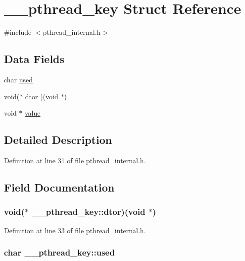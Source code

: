 \hypertarget{struct____pthread__key}{\section{\+\_\+\+\_\+pthread\+\_\+key Struct Reference}
\label{struct____pthread__key}
}


{\ttfamily \#include $<$pthread\+\_\+internal.\+h$>$}

\subsection*{Data Fields}
\begin{DoxyCompactItemize}
\item 
char \hyperlink{struct____pthread__key_a81c10bf0d5d76671f389c4aec1af2e1b}{used}
\item 
void($\ast$ \hyperlink{struct____pthread__key_a8a2c00bb7dbce7d43b3078c6214bc390}{dtor} )(void $\ast$)
\item 
void $\ast$ \hyperlink{struct____pthread__key_a35d38627e4a0de2e247671f0b5b6322a}{value}
\end{DoxyCompactItemize}


\subsection{Detailed Description}


Definition at line 31 of file pthread\+\_\+internal.\+h.



\subsection{Field Documentation}
\hypertarget{struct____pthread__key_a8a2c00bb7dbce7d43b3078c6214bc390}{
\subsubsection[{dtor}]{\setlength{\rightskip}{0pt plus 5cm}void($\ast$ \+\_\+\+\_\+pthread\+\_\+key\+::dtor)(void $\ast$)}}\label{struct____pthread__key_a8a2c00bb7dbce7d43b3078c6214bc390}


Definition at line 33 of file pthread\+\_\+internal.\+h.

\hypertarget{struct____pthread__key_a81c10bf0d5d76671f389c4aec1af2e1b}{
\subsubsection[{used}]{\setlength{\rightskip}{0pt plus 5cm}char \+\_\+\+\_\+pthread\+\_\+key\+::used}}\label{struct____pthread__key_a81c10bf0d5d76671f389c4aec1af2e1b}


